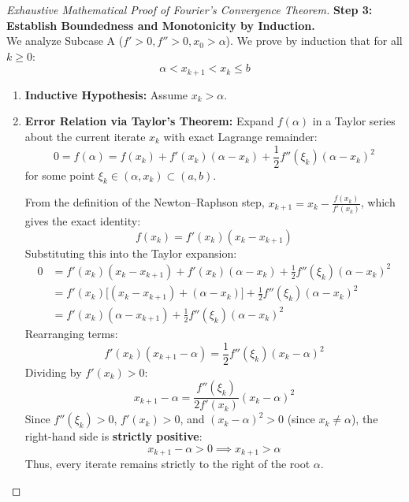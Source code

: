 \begin{proof}[Exhaustive Mathematical Proof of Fourier's Convergence Theorem]
\medskip
\noindent\textbf{Step 3: Establish Boundedness and Monotonicity by Induction.} \\
We analyze Subcase A ($f' > 0, f'' > 0, x_0 > \alpha$). We prove by induction that for all $k \ge 0$:
\begin{equation}
    \alpha < x_{k+1} < x_k \le b
\end{equation}
\begin{enumerate}
    \item \textbf{Inductive Hypothesis:} Assume $x_k > \alpha$.
    \item \textbf{Error Relation via Taylor's Theorem:}
    Expand $f(\alpha)$ in a Taylor series about the current iterate $x_k$ with exact Lagrange remainder:
    \begin{equation}
        0 = f(\alpha) = f(x_k) + f'(x_k)(\alpha - x_k) + \frac{1}{2} f''(\xi_k)(\alpha - x_k)^2
    \end{equation}
    for some point $\xi_k \in (\alpha, x_k) \subset (a, b)$.
    
    From the definition of the Newton--Raphson step, $x_{k+1} = x_k - \frac{f(x_k)}{f'(x_k)}$, which gives the exact identity:
    \begin{equation}
        f(x_k) = f'(x_k)(x_k - x_{k+1})
    \end{equation}
    Substituting this into the Taylor expansion:
    \begin{align}
        0 &= f'(x_k)(x_k - x_{k+1}) + f'(x_k)(\alpha - x_k) + \frac{1}{2} f''(\xi_k)(\alpha - x_k)^2 \nonumber \\
        &= f'(x_k)\big[ (x_k - x_{k+1}) + (\alpha - x_k) \big] + \frac{1}{2} f''(\xi_k)(\alpha - x_k)^2 \nonumber \\
        &= f'(x_k)(\alpha - x_{k+1}) + \frac{1}{2} f''(\xi_k)(\alpha - x_k)^2
    \end{align}
    Rearranging terms:
    \begin{equation}
        f'(x_k)(x_{k+1} - \alpha) = \frac{1}{2} f''(\xi_k)(x_k - \alpha)^2
    \end{equation}
    Dividing by $f'(x_k) > 0$:
    \begin{equation}
        \boxed{x_{k+1} - \alpha = \frac{f''(\xi_k)}{2 f'(x_k)} (x_k - \alpha)^2}
    \end{equation}
    Since $f''(\xi_k) > 0$, $f'(x_k) > 0$, and $(x_k - \alpha)^2 > 0$ (since $x_k \ne \alpha$), the right-hand side is \textbf{strictly positive}:
    \begin{equation}
        x_{k+1} - \alpha > 0 \implies \boxed{x_{k+1} > \alpha}
    \end{equation}
    Thus, every iterate remains strictly to the right of the root $\alpha$.
    

\end{enumerate}
\end{proof}
